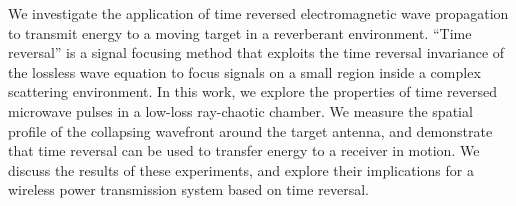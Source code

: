 We investigate the application of time reversed electromagnetic wave propagation
to transmit energy to a moving target in a reverberant environment.
%
``Time reversal'' is a signal focusing method that exploits the time reversal
invariance of the lossless wave equation to focus signals on a small region
inside a complex scattering environment.
%
In this work, we explore the properties of time reversed microwave pulses in a
low-loss ray-chaotic chamber.
%
We measure the spatial profile of the collapsing wavefront around the target
antenna, and demonstrate that time reversal can be used to transfer energy to a
receiver in motion.
%
We discuss the results of these experiments, and explore their implications for
a wireless power transmission system based on time reversal.
